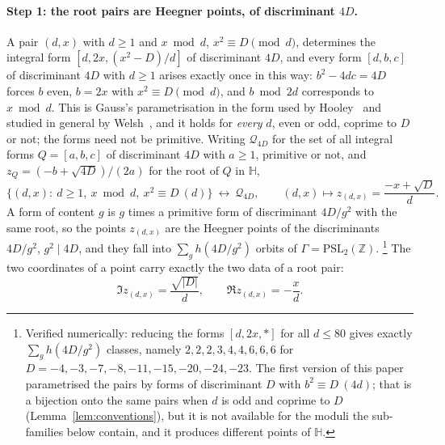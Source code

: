 \documentclass[11pt,a4paper]{article}
\theoremstyle{remark}\newtheorem{remark}[theorem]{Remark}
\newcommand{\Z}{\mathbb Z}\newcommand{\R}{\mathbb R}\newcommand{\Q}{\mathbb Q}\newcommand{\C}{\mathbb C}
\begin{document}
\paragraph{Step 1: the root pairs are Heegner points, of discriminant $4D$.} A pair $(d,x)$ with $d\ge1$ and
$x\bmod d$, $x^2\equiv D\pmod d$, determines the integral form $[d,2x,(x^2-D)/d]$ of discriminant $4D$, and every
form $[d,b,c]$ of discriminant $4D$ with $d\ge1$ arises exactly once in this way: $b^2-4dc=4D$ forces $b$ even, $b=2x$
with $x^2\equiv D\pmod d$, and $b\bmod2d$ corresponds to $x\bmod d$. This is Gauss's parametrisation in the form used
by Hooley~\cite[\S3]{Hooley1963} and studied in general by Welsh~\cite{Welsh2022}, and it holds for \emph{every} $d$,
even or odd, coprime to $D$ or not; the forms need not be primitive. Writing $\mathcal Q_{4D}$ for the set of all
integral forms $Q=[a,b,c]$ of discriminant $4D$ with $a\ge1$, primitive or not, and $z_Q=(-b+\sqrt{4D})/(2a)$ for the root
of $Q$ in $\mathbb H$,
\begin{equation}\label{eq:gauss}
\{(d,x):\ d\ge1,\ x\bmod d,\ x^2\equiv D\ (d)\}\ \longleftrightarrow\ \mathcal Q_{4D},\qquad
(d,x)\mapsto z_{(d,x)}=\frac{-x+\sqrt D}{d}.
\end{equation}
A form of content $g$ is $g$ times a primitive form of discriminant $4D/g^2$ with the same root, so the points
$z_{(d,x)}$ are the Heegner points of the discriminants $4D/g^2$, $g^2\mid4D$, and they fall into
$\sum_gh(4D/g^2)$ orbits of $\Gamma=\mathrm{PSL}_2(\Z)$. \footnote{Verified numerically: reducing the forms
$[d,2x,\ast]$ for all $d\le80$ gives exactly $\sum_gh(4D/g^2)$ classes, namely $2,2,2,3,4,4,6,6,6$ for
$D=-4,-3,-7,-8,-11,-15,-20,-24,-23$. The first version of this paper parametrised the pairs by forms of discriminant
$D$ with $b^2\equiv D\ (4d)$; that is a bijection onto the same pairs when $d$ is odd and coprime to $D$
(Lemma~\ref{lem:conventions}), but it is not available for the moduli the sub-families below contain, and it produces
different points of $\mathbb H$.} The two coordinates of a point carry exactly the two data of a root pair:
\begin{equation}\label{eq:coords}
\Im z_{(d,x)}=\frac{\sqrt{|D|}}{d},\qquad \Re z_{(d,x)}=-\frac xd.
\end{equation}
\end{document}
